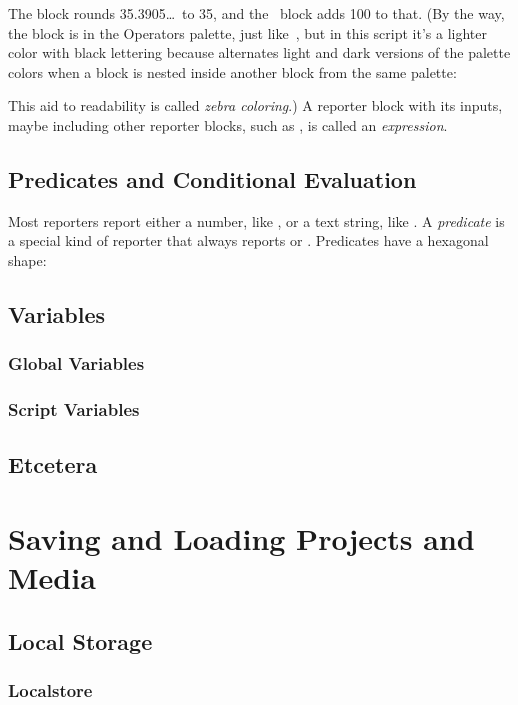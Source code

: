 \documentclass{report}
\begin{document}
The  block rounds 35.3905\ldots\ to 35, and the \code{+}~block adds 100 to that. (By the way, the  block is in the Operators palette, just like~\code{+}, but in this script it's a lighter color with black lettering because \Snap{} alternates light and dark versions of the palette colors when a block is nested inside another block from the same palette:


This aid to readability is called \emph{zebra coloring}.) A reporter block with its inputs, maybe including other reporter blocks, such as , is called an \emph{expression}.

\section{Predicates and Conditional Evaluation}

Most reporters report either a number, like , or a text string, like . A \emph{predicate} is a special kind of reporter that always reports  or . Predicates have a hexagonal shape:

\section{Variables}
\subsection{Global Variables}
\subsection{Script Variables}
\section{Etcetera}
\chapter{Saving and Loading Projects and Media}
\section{Local Storage}
\subsection{Localstore}
\end{document}
